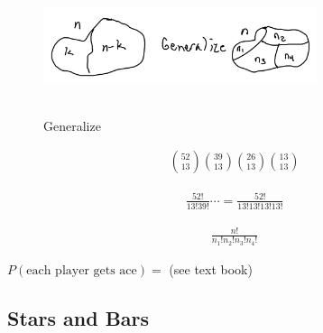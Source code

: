 
\begin{figure}[h]
\centering
\includegraphics[width=8cm, height=4cm]{images/L04/generalize.jpeg}
\caption{Generalize}
\end{figure}

\begin{align*}
    {52 \choose 13}{39 \choose 13}{26 \choose 13}{13 \choose 13}
\end{align*}

\begin{align*}
    \frac{52!}{13!39!} \cdots = \frac{52!}{13!13!13!13!}
\end{align*}

\begin{align}
    \frac{n!}{n_1!n_2!n_3!n_4!}
\end{align}

$P(\text{each player gets ace}) = $ (see text book)

\subsection{Stars and Bars}
